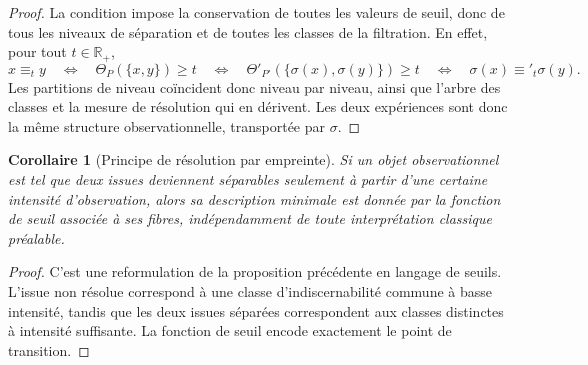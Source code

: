 \documentclass[11pt,a4paper]{article}
\newtheorem{corollary}{Corollaire}
\begin{document}
\begin{appendices}
\begin{proof}
La condition impose la conservation de toutes les valeurs de seuil, donc de tous les niveaux de séparation et de toutes les classes de la filtration. En effet, pour tout \(t\in\mathbb R_+\),
\[
x\equiv_t y
\quad\Longleftrightarrow\quad
\Theta_P(\{x,y\})\ge t
\quad\Longleftrightarrow\quad
\Theta'_{P'}(\{\sigma(x),\sigma(y)\})\ge t
\quad\Longleftrightarrow\quad
\sigma(x)\equiv'_t \sigma(y).
\]
Les partitions de niveau coïncident donc niveau par niveau, ainsi que l'arbre des classes et la mesure de résolution qui en dérivent. Les deux expériences sont donc la même structure observationnelle, transportée par \(\sigma\).
\end{proof}

\begin{corollary}[Principe de résolution par empreinte]
Si un objet observationnel est tel que deux issues deviennent séparables seulement à partir d'une certaine intensité d'observation, alors sa description minimale est donnée par la fonction de seuil associée à ses fibres, indépendamment de toute interprétation classique préalable.
\end{corollary}

\begin{proof}
C'est une reformulation de la proposition précédente en langage de seuils. L'issue non résolue correspond à une classe d'indiscernabilité commune à basse intensité, tandis que les deux issues séparées correspondent aux classes distinctes à intensité suffisante. La fonction de seuil encode exactement le point de transition.
\end{proof}


















\end{appendices}
\end{document}
